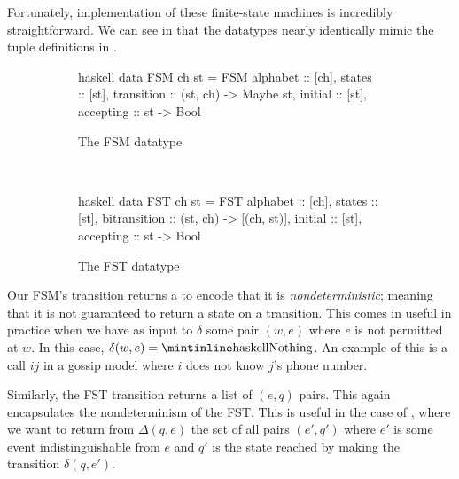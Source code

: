 \documentclass[10pt, a4paper]{report}
\begin{document}
Fortunately, implementation of these finite-state machines is incredibly
straightforward. We can see in  that the datatypes nearly
identically mimic the tuple definitions in .


\begin{figure}[h]
  \centering
  \begin{subfigure}[b]{0.5\textwidth}
    \begin{cminted}{haskell}
      data FSM ch st = FSM {
        alphabet :: [ch],              
        states :: [st],               
        transition :: (st, ch) -> Maybe st,
        initial :: [st],            
        accepting :: st -> Bool    
       }
    \end{cminted}
    \caption{The FSM datatype}
  \end{subfigure}%
~
  \begin{subfigure}[b]{0.5\textwidth}
    \begin{cminted}{haskell}
      data FST ch st = FST {
        alphabet :: [ch],                     
        states :: [st],                       
        bitransition :: (st, ch) -> [(ch, st)],
        initial :: [st],                      
        accepting :: st -> Bool              
      }
    \end{cminted}
    \caption{The FST datatype}
  \end{subfigure}
  \caption{}
  \label{fig:FSMFST}
\end{figure}

Our FSM's transition returns a  to encode that it is
\emph{nondeterministic}; meaning that it is not guaranteed to return a state on
a transition. This comes in useful in practice when we have as input to $\delta$
some pair $(w, e)$ where $e$ is not permitted at $w$. In this case, $\delta(w,
e) = \text{\mih{Nothing}}$. An example of this is a call $ij$ in a gossip model
where $i$ does not know $j$'s phone number.

Similarly, the FST transition returns a list of $(e, q)$ pairs. This again
encapsulates the nondeterminism of the FST. This is useful in the case of
, where we want to return from
$\Delta(q, e)$ the set of all pairs $(e', q')$ where $e'$ is some event
indistinguishable from $e$ and $q'$ is the state reached by making the
transition $\delta(q, e')$.
\end{document}

